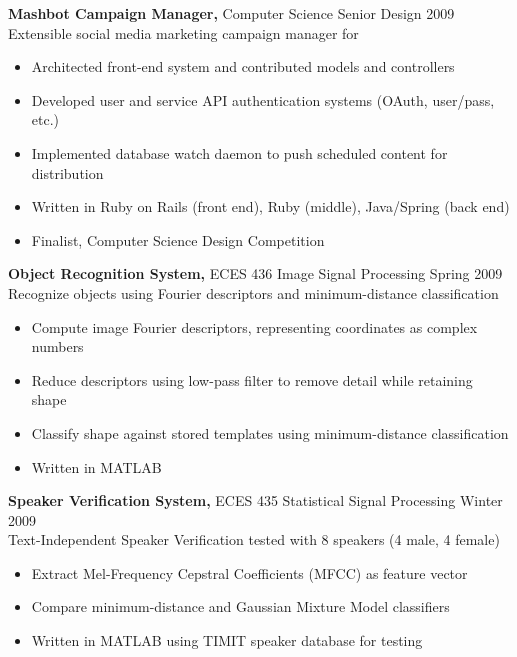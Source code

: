 \documentclass[margin]{res}
\begin{document}
\begin{resume}
\begin{software}
 {\bf Mashbot Campaign Manager,} Computer Science Senior Design \hfill 2009 \\
Extensible social media marketing campaign manager for 
 \begin{itemize} \itemsep -2pt  %
 \item Architected front-end system and contributed models and controllers
 \item Developed user and service API authentication systems (OAuth, user/pass, etc.)
 \item Implemented database watch daemon to push scheduled content for distribution
 \item Written in Ruby on Rails (front end), Ruby (middle), Java/Spring (back end)
 \item Finalist, Computer Science Design Competition
 \end{itemize}
\end{software}

\begin{telecom}
 {\bf Object Recognition System,} ECES 436 Image Signal Processing \hfill Spring 2009 \\
Recognize objects using Fourier descriptors and minimum-distance classification
 \begin{itemize} \itemsep -2pt  %
 \item Compute image Fourier descriptors, representing coordinates as complex numbers
 \item Reduce descriptors using low-pass filter to remove detail while retaining shape
 \item Classify shape against stored templates using minimum-distance classification
 \item Written in MATLAB
 \end{itemize}
\end{telecom}

\begin{telecom}
 {\bf Speaker Verification System,} ECES 435 Statistical Signal Processing \hfill Winter 2009 \\
Text-Independent Speaker Verification tested with 8 speakers (4 male, 4 female)
 \begin{itemize} \itemsep -2pt  %
 \item Extract Mel-Frequency Cepstral Coefficients (MFCC) as feature vector
 \item Compare minimum-distance and Gaussian Mixture Model classifiers
 \item Written in MATLAB using TIMIT speaker database for testing
 \end{itemize}
\end{telecom}


\end{resume}
\end{document}
